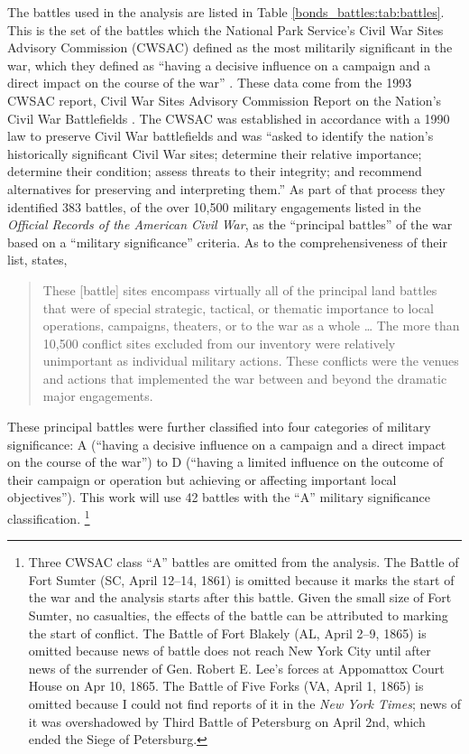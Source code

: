 The battles used in the analysis are listed in Table \ref{bonds_battles:tab:battles}.
This is the set of the battles which the National Park Service's Civil War Sites Advisory Commission (CWSAC) defined as the most militarily significant in the war, which they defined as ``having a decisive influence on a campaign and a direct impact on the course of the war'' \parencite{CWSAC1993}.
These data come from the 1993 CWSAC report, Civil War Sites Advisory Commission Report on the Nation's Civil War Battlefields \parencites{CWSAC1993}{CWSAC1993b}.
The CWSAC was established in accordance with a 1990 law to preserve Civil War battlefields and was ``asked to identify the nation's historically significant Civil War sites; determine their relative importance; determine their condition; assess threats to their integrity; and recommend alternatives for preserving and interpreting them.'' \parencite{CWSAC1993b}
As part of that process they identified 383 battles, of the over 10,500 military engagements listed in the \textit{Official Records of the American Civil War}, as the ``principal battles'' of the war based on a ``military significance'' criteria. 
As to the comprehensiveness of their list, \parencite{CWSAC1993} states,
\begin{quote}
  These [battle] sites encompass virtually all of the principal land battles that were of special strategic, tactical, or thematic importance to local operations, campaigns, theaters, or to the war as a whole \dots{} 
  The more than 10,500 conflict sites excluded from our inventory were relatively unimportant as individual military actions.
  These conflicts were the venues and actions that implemented the war between and beyond the dramatic major engagements. 
\end{quote}
These principal battles were further classified into four categories of military significance: A (``having a decisive influence on a campaign and a direct impact on the course of the war'') to D (``having a limited influence on the outcome of their campaign or operation but achieving or affecting important local objectives'').
This work will use  42 battles with the ``A'' military significance classification.%
\footnote{
  Three CWSAC class ``A'' battles are omitted from the analysis.
  The Battle of Fort Sumter (SC, April 12--14, 1861) is omitted because it marks the start of the war and the analysis starts after this battle.
  Given the small size of Fort Sumter, no casualties, the effects of the battle can be attributed to marking the start of conflict.
  The Battle of Fort Blakely (AL, April 2--9, 1865) is omitted because news of battle does not reach New York City until after news of the surrender of Gen. Robert E. Lee's forces at Appomattox Court House on Apr 10, 1865.
  The Battle of Five Forks (VA, April 1, 1865) is omitted because I could not find reports of it in the \textit{New York Times}; news of it was overshadowed by Third Battle of Petersburg on April 2nd, which ended the Siege of Petersburg.
}
